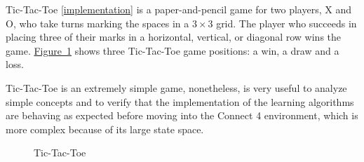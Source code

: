 \documentclass{article}
\newcommand{\GithubURL}[1]{[\href{https://github.com/davidrobles/mlnd-capstone-code/blob/master/#1}{implementation}]}
\begin{document}
Tic-Tac-Toe \GithubURL{capstone/game/games/tictactoe.py} is a paper-and-pencil game for two players,
X and O, who take turns marking the spaces in a $3 \times 3$ grid. The player who succeeds in
placing three of their marks in a horizontal, vertical, or diagonal row wins the game.
\hyperref[fig:tic-env]{Figure~\ref*{fig:tic-env}} shows three Tic-Tac-Toe game positions: a win, a
draw and a loss.

Tic-Tac-Toe is an extremely simple game, nonetheless, is very useful to analyze simple concepts and
to verify that the implementation of the learning algorithms are behaving as expected before moving
into the Connect 4 environment, which is more complex because of its large state space.


\begin{figure}[!b]
    \centering
     \hspace{0.2in}
     \hspace{0.2in}
    \caption{Tic-Tac-Toe}
    \label{fig:tic-env}
\end{figure}

\pagebreak[4]

\end{document}
